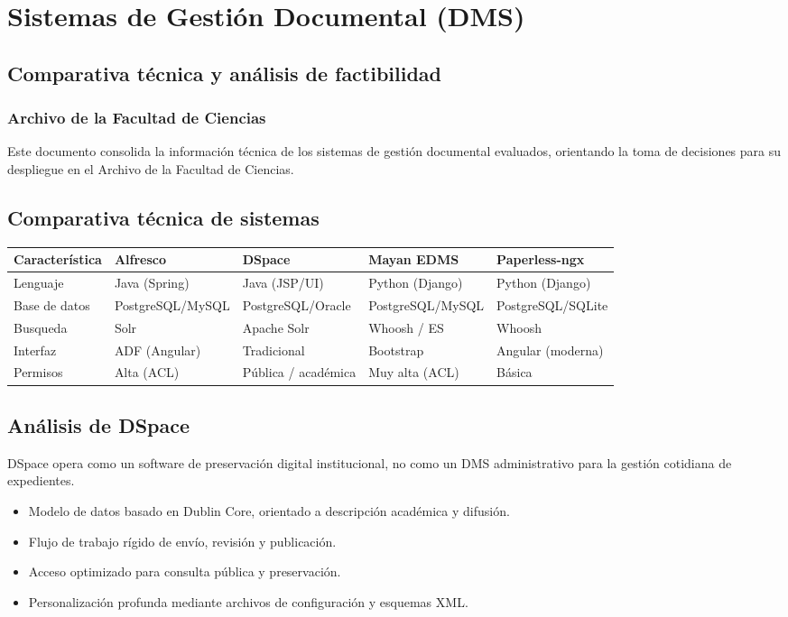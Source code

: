 \section{Sistemas de Gestión Documental (DMS)}
\subsection{Comparativa técnica y análisis de factibilidad}
\subsubsection{Archivo de la Facultad de Ciencias}
Este documento consolida la información técnica de los sistemas de gestión documental evaluados, orientando la toma de decisiones para su despliegue en el Archivo de la Facultad de Ciencias.

\subsection{Comparativa técnica de sistemas}
\begin{longtable}{p{} p{} p{} p{} p{}}
\toprule
\textbf{Característica} & \textbf{Alfresco} & \textbf{DSpace} & \textbf{Mayan EDMS} & \textbf{Paperless-ngx} \\
\midrule
Lenguaje & Java (Spring) & Java (JSP/UI) & Python (Django) & Python (Django) \\
Base de datos & PostgreSQL/MySQL & PostgreSQL/Oracle & PostgreSQL/MySQL & PostgreSQL/SQLite \\
Busqueda & Solr & Apache Solr & Whoosh / ES & Whoosh \\
Interfaz & ADF (Angular) & Tradicional & Bootstrap & Angular (moderna) \\
Permisos & Alta (ACL) & Pública / académica & Muy alta (ACL) & Básica \\
\bottomrule
\end{longtable}

\subsection{Análisis de DSpace}
DSpace opera como un software de preservación digital institucional, no como un DMS administrativo para la gestión cotidiana de expedientes.

\begin{itemize}
  \item Modelo de datos basado en Dublin Core, orientado a descripción académica y difusión.
  \item Flujo de trabajo rígido de envío, revisión y publicación.
  \item Acceso optimizado para consulta pública y preservación.
  \item Personalización profunda mediante archivos de configuración y esquemas XML.
\end{itemize}

